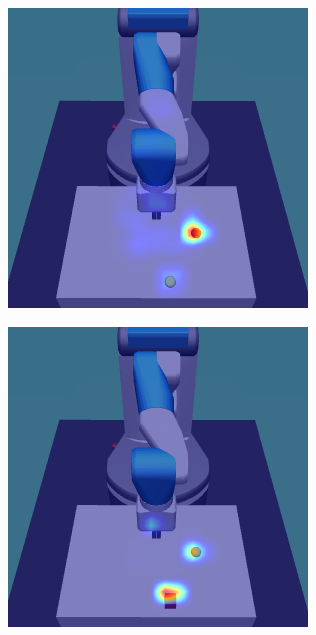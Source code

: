 \begin{figure}
  \begin{subfigure}{0.24\columnwidth}
    \includegraphics[width=\linewidth]{figures/chapter6/distractor_saliency_fetch_pro_on/color_sensor_std}
  \end{subfigure}
  \begin{subfigure}{0.24\columnwidth}
    \includegraphics[width=\linewidth]{figures/chapter6/distractor_saliency_fetch_pro_on/shape_sensor_std}

\end{subfigure}
\end{figure}
